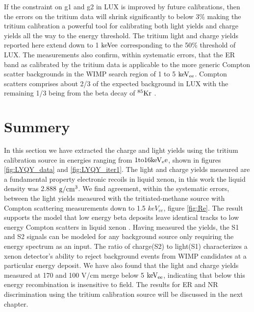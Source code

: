 If the constraint on g1 and g2 in LUX is improved by future calibrations, then the errors on the tritium data will shrink significantly to below 3\% making the tritium calibration a powerful tool for calibrating both light yields and charge yields all the way to the energy threshold. The tritium light and charge yields reported here extend down to 1 $\rm keVee$ corresponding to the 50\% threshold of LUX. The measurements also confirm, within systematic errors, that the ER band as calibrated by the tritium data is applicable to the more generic Compton scatter backgrounds in the WIMP search region of 1 to 5 $\rm keV_{ee}$. Compton scatters comprises about 2/3 of the expected background in LUX with the remaining 1/3 being from the beta decay of $\rm ^{85}Kr$ \cite{LUX_BG}.


\section{Summery}

In this section we have extracted the charge and light yields using the tritium calibration source in energies ranging from $\rm 1 to 16 keV_ee$, shown in figures \ref{fig:LYQY_data} and \ref{fig:LYQY_iter1}. The light and charge yields measured are a fundamental property electronic recoils in liquid xenon, in this work the liquid density was 2.888 $\rm g/cm^3$. We find agreement, within the systematic errors, between the light yields measured with the tritiated-methane source with Compton scattering measurements down to 1.5 $keV_{ee}$, figure \ref{fig:Re}. The result supports the model that low energy beta deposits leave identical tracks to low energy Compton scatters in liquid xenon \cite{NEST} \cite{NEST_2013}. Having measured the yields, the S1 and S2 signals can be modeled for any background source only requiring the energy spectrum as an input. The ratio of charge(S2) to light(S1) characterizes a xenon detector's ability to reject background events from WIMP candidates at a particular energy deposit. We have also found that the light and charge yields measured at 170 and 100 V/cm merge below 5 $\rm keV_{ee}$, indicating that below this energy recombination is insensitive to field. The results for ER and NR discrimination using the tritium calibration source will be discussed in the next chapter.


